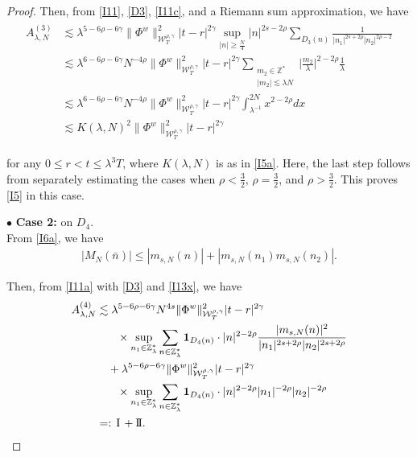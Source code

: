 \documentclass[letterpaper, 11pt,  reqno]{amsart}
\newcommand{\1}{\hspace{0.5mm}\text{I}\hspace{0.5mm}}
\newcommand{\II}{\text{I \hspace{-2.8mm} I} }
\newcommand{\noi}{\noindent}
\newcommand{\Z}{\mathbb{Z}}
\newcommand{\g}{\gamma}
\newcommand{\ld}{\lambda}
\newcommand{\les}{\lesssim}
\newcommand{\ind}{\mathbf 1}
\newcommand{\W}{\mathcal{W}}
\numberwithin{equation}{section}
\numberwithin{theorem}{section}
\begin{document}
\begin{proof}
\noi
Then, from 
\eqref{I11}, \eqref{D3},   \eqref{I11c}, 
and a Riemann sum approximation,  we have 
\begin{align}
\begin{split}
A_{\ld, N}^{(3)}
&  \les 
\ld^{5-6\rho - 6\g}
  \|\Phi^{w} \|^2_{\W^{\rho,\g}_T} |t-r|^{2\g}
\sup_{|n|\geq \frac N4}|n|^{2s-2\rho}
\sum_{D_3(n)} \frac{1}{|n_1|^{2s+2\rho}|n_2|^{2\rho-2}}\\
&  \les 
\ld^{6-6\rho - 6\g}N^{-4\rho}
  \|\Phi^{w} \|^2_{\W^{\rho,\g}_T} |t-r|^{2\g}
  \sum_{\substack{m_2 \in \Z^*\\ |m_2|\les \ld N}} 
 \Big|\frac {m_2}\ld \Big|^{2-2\rho}\frac 1\ld\\
&  \les 
\ld^{6-6\rho - 6\g}N^{-4\rho}
  \|\Phi^{w} \|^2_{\W^{\rho,\g}_T} |t-r|^{2\g}
\int_{\ld^{-1}}^{2N} x^{2- 2\rho} dx\\
 &\les 
K(\ld, N)^2
 \| \Phi^{w} \|^2_{\W_{T}^{\rho, \g}}  
|t-r|^{2\g}
\end{split}
\label{I11b}
 \end{align}
 
 
 \noi
for any $0\leq r<t\leq \ld^3T$, 
where $K(\ld, N)$ is as in \eqref{I5a}. 
Here, the last step follows
from separately estimating 
the cases when $\rho < \frac 32$, 
$\rho = \frac 32$, 
and $\rho > \frac 32$.
This proves
 \eqref{I5} in this case.









\medskip

\noi
$\bullet$ \textbf{Case 2:} on  $D_4$.\\
\indent
From \eqref{I6a}, we have
\begin{align}
|M_N(\bar n)|\le |m_{s, N} (n)| + | m_{s, N} (n_1) m_{s, N}(n_2)|.
\label{I13x}
\end{align}

\noi
Then, from \eqref{I11a} with \eqref{D3}  and \eqref{I13x}, we have 
\begin{align}
\begin{split}
A_{\ld, N}^{(4)}
& \les 
\ld^{5-6\rho -6\g}N^{4s }
\| \Phi^{w} \|^2_{\W_{T}^{\rho, \g}} 
|t-r|^{2\g} \\
& \hphantom{XX}
\times
\sup_{n_1 \in \Z_\ld^*} 
\sum_{n\in \Z_\ld^*} 
\ind_{D_4(n)}\cdot
|n|^{2-2\rho}
\frac{  |m_{s, N}(n)|^2}{|n_1|^{2s + 2\rho}|n_2|^{2s + 2\rho}}\\
& \quad + 
\ld^{5-6\rho -6\g}
\| \Phi^{w} \|^2_{\W_{T}^{\rho, \g}} 
|t-r|^{2\g} \\
& \hphantom{XX}
\times
\sup_{n_1 \in \Z_\ld^*} 
\sum_{n\in \Z_\ld^*} 
\ind_{D_4(n)}\cdot|n|^{2-2\rho}
|n_1|^{- 2\rho}|n_2|^{- 2\rho}\\
 & =: \1 + \II.
\end{split}
\label{I13a}
\end{align}










\end{proof}
\end{document}
